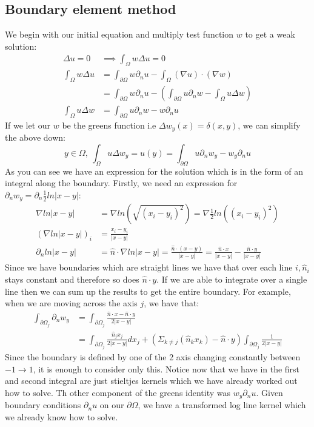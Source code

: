 \documentclass{article}
\begin{document}
\subsection{Boundary element method}
We begin with our initial equation and multiply test function $w$ to get a weak solution:
\begin{align}
    \Delta u=0&\implies \int_\Omega w\Delta u=0\\
    \int_\Omega w\Delta u&=\int_{\partial\Omega}w\partial_nu-\int_\Omega(\nabla u)\cdot(\nabla w)\\
    &=\int_{\partial\Omega}w\partial_nu-(\int_{\partial\Omega}u\partial_nw-\int_\Omega u\Delta w)\\
    \int_\Omega u\Delta w&=\int_{\partial\Omega}u\partial_nw-w\partial_nu
\end{align}
If we let our $w$ be the greens function i.e $\Delta w_y(x) = \delta(x,y)$, we can simplify the above down:
$$y\in\Omega,\:\int_\Omega u\Delta w_y=u(y)=\int_{\partial\Omega}u\partial_nw_y-w_y\partial_nu$$
As you can see we have an expression for the solution which is in the form of an integral along the boundary.
Firstly, we need an expression for $\partial_nw_y = \partial_n\frac{1}{2}ln|x-y|$:
\begin{align}
    \nabla ln|x-y|&=\nabla ln(\sqrt{(x_i-y_i)^2})=\nabla\frac{1}{2}ln((x_i-y_i)^2)\\
    (\nabla ln|x-y|)_i &=\frac{x_i-y_i}{|x-y|}\\
    \partial_n ln|x-y| &= \hat n\cdot\nabla ln|x-y| = \frac{\hat n\cdot(x-y)}{|x-y|} = \frac{\hat n\cdot x}{|x-y|}-\frac{\hat n\cdot y}{|x-y|}
\end{align}
Since we have boundaries which are straight lines we have that over each line $i,\hat n_i$ stays constant and therefore so does $\hat n\cdot y$.
If we are able to integrate over a single line then we can sum up the results to get the entire boundary.
For example, when we are moving across the axis $j$, we have that:
\begin{align}
    \int_{\partial\Omega_j}\partial_nw_y&=\int_{\partial\Omega_j}\frac{\hat n\cdot x-\hat n\cdot y}{2|x-y|}\\
    &=\int_{\partial\Omega_j}\frac{\hat n_jx_j}{2|x-y|}dx_j+(\Sigma_{k\neq j}(\hat n_kx_k)-\hat n\cdot y)\int_{\partial\Omega_j}\frac{1}{2|x-y|}
\end{align}
Since the boundary is defined by one of the 2 axis changing constantly between $-1\rightarrow 1$, it is enough to consider only this.
Notice now that we have in the first and second integral are just stieltjes kernels which we have already worked out how to solve.
Th other component of the greens identity was $w_y\partial_nu$.
Given boundary conditions $\partial_nu$ on our $\partial\Omega$, we have a transformed log line kernel which we already know how to solve.
\end{document}

